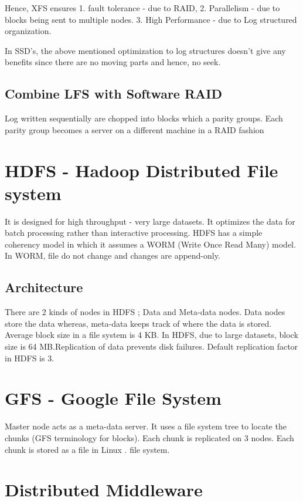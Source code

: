 \documentclass[a4paper]{article}
\begin{document}
Hence, XFS ensures 1. fault tolerance - due to RAID, 2. Parallelism - due to blocks being sent to multiple nodes. 3. High Performance - due to Log structured organization.

In SSD's, the above mentioned optimization to log structures doesn't give any benefits since there are no moving parts and hence, no seek.

\subsection{Combine LFS with Software RAID}
Log written sequentially are chopped into blocks which a parity groups. Each parity group becomes a server on a different machine in a RAID fashion

\section{HDFS - Hadoop Distributed File system}

It is designed for high throughput - very large datasets. It optimizes the data for batch processing rather than interactive processing. HDFS has a simple coherency model in which it assumes a  WORM (Write Once Read Many) model. In WORM, file do not change and changes are append-only.

\subsection{Architecture}

There are 2 kinds of nodes in HDFS ; Data and Meta-data nodes. Data nodes store the data whereas, meta-data keeps track of where the data is stored. Average block size in a file system is 4 KB. In HDFS, due to large datasets, block size is 64 MB.Replication of data prevents disk failures. Default replication factor in HDFS is 3.

\section{GFS - Google File System}

Master node acts as a meta-data server. It uses a file system tree to locate the chunks (GFS terminology for blocks). Each chunk is replicated on 3 nodes. Each chunk is stored as a file in Linux .
file system.


\section{Distributed Middleware}
\end{document}
